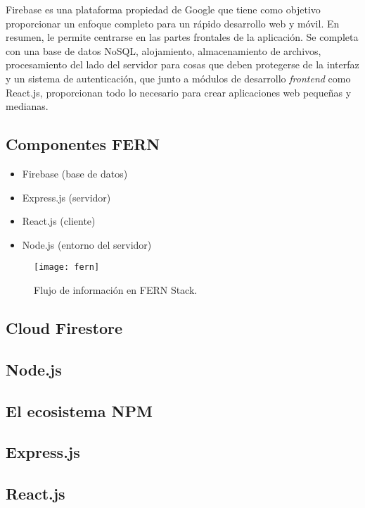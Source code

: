 Firebase es una plataforma propiedad de Google que tiene como objetivo proporcionar un enfoque completo para un rápido desarrollo web y móvil. En resumen, le permite centrarse en las partes frontales de la aplicación. Se completa con una base de datos NoSQL, alojamiento, almacenamiento de archivos, procesamiento del lado del servidor para cosas que deben protegerse de la interfaz y un sistema de autenticación, que junto a módulos de desarrollo \textit{frontend} como React.js, proporcionan todo lo necesario para crear aplicaciones web pequeñas y medianas.
\vspace{0.8cm}

\subsection{Componentes FERN}
\begin{itemize}
  \item Firebase (base de datos)
  \item Express.js (servidor)
  \item React.js (cliente)
  \item Node.js (entorno del servidor)
\end{itemize}
\begin{figure}[H]
  \centering
  \texttt{[image: fern]}
  \caption{Flujo de información en FERN Stack.}
\end{figure}

\subsection{Cloud Firestore}


\subsection{Node.js}


\subsection{El ecosistema NPM}


\subsection{Express.js}


\subsection{React.js}

